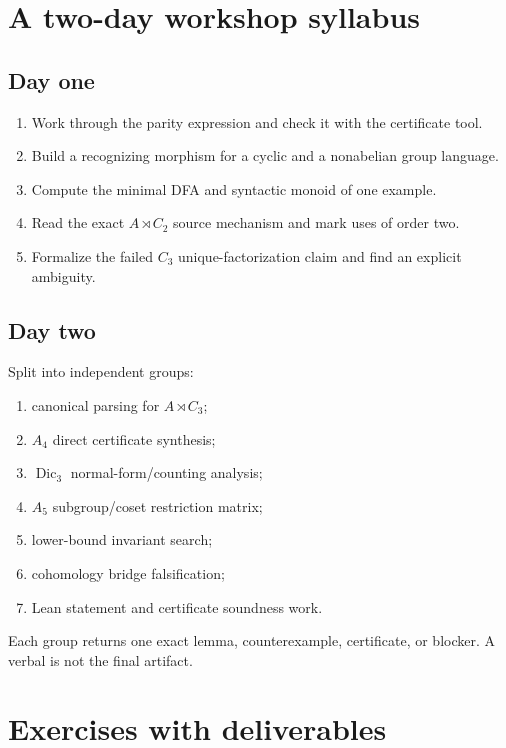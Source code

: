 \documentclass{amsart}
\begin{document}
\section{A two-day workshop syllabus}

\subsection{Day one}

\begin{enumerate}
  \item Work through the parity expression and check it with the certificate tool.
  \item Build a recognizing morphism for a cyclic and a nonabelian group language.
  \item Compute the minimal DFA and syntactic monoid of one example.
  \item Read the exact $A\rtimes C_2$ source mechanism and mark uses of order two.
  \item Formalize the failed $C_3$ unique-factorization claim and find an explicit ambiguity.
\end{enumerate}

\subsection{Day two}

Split into independent groups:
\begin{enumerate}
  \item canonical parsing for $A\rtimes C_3$;
  \item $A_4$ direct certificate synthesis;
  \item $\operatorname{Dic}_3$ normal-form/counting analysis;
  \item $A_5$ subgroup/coset restriction matrix;
  \item lower-bound invariant search;
  \item cohomology bridge falsification;
  \item Lean statement and certificate soundness work.
\end{enumerate}
Each group returns one exact lemma, counterexample, certificate, or blocker.  A verbal  is not the final artifact.

\section{Exercises with deliverables}
\end{document}
